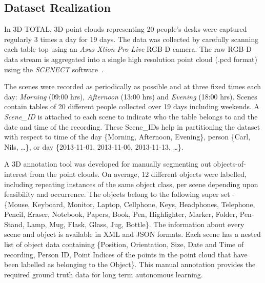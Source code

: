 \documentclass[letterpaper, 10 pt, conference]{ieeeconf}  %
\begin{document}
\subsection{Dataset Realization}
\label{ssec:Dataset Realization}
In 3D-TOTAL, 3D point clouds representing 20 people's desks were captured regularly 3 times a day for 19 days. The data was collected by 
carefully scanning each table-top using an \textit{Asus Xtion Pro Live} RGB-D camera. The raw RGB-D data stream is aggregated into a single 
high resolution point cloud (.pcd format) using the \textit{SCENECT} software~\cite{Buerkler:Online2012}.

The scenes were recorded as periodically as possible and at three fixed times each day: \emph{Morning} (09:00 hrs), \emph{Afternoon} (13:00 
hrs) and \emph{Evening} (18:00 hrs). Scenes contain tables of 20 different people collected over 19 days including weekends. 
A \textit{Scene\_ID} is attached to each scene to indicate who the table belongs to and the date and time of the recording. These Scene\_IDs help in partitioning the dataset with respect to time of the day \{Morning, Afternoon, Evening\}, person \{Carl, Nils, \dots\}, or day \{2013-11-01, 2013-11-06, 2013-11-13, \dots\}.

A 3D annotation tool was developed for manually segmenting out objects-of-interest from the point clouds. On average, 12 different objects 
were labelled, including repeating instances of the same object class, per scene depending upon feasibility and occurrence. The objects 
belong to the following super set - \{Mouse, Keyboard, Monitor, Laptop, Cellphone, Keys, Headphones, Telephone, Pencil, Eraser, Notebook, 
Papers,  Book, Pen, Highlighter, Marker, Folder, Pen-Stand, Lamp, Mug, Flask, Glass, Jug, Bottle\}. The information about every scene and 
object is available in  XML and JSON formats. Each scene has a nested list of object data containing \{Position, Orientation, Size, Date and 
Time of recording, Person ID, Point Indices of the points in the point cloud that have been labelled as belonging to the Object\}. This 
manual annotation provides the required ground truth data for long term autonomous learning.
\end{document}
